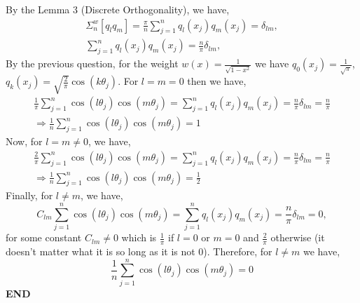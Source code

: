 \documentclass[12pt,a4paper]{article}
\begin{document}
By the Lemma 3 (Discrete Orthogonality), we have,
\begin{align*}
	\ensuremath{\Sigma}_{n}^w[q_lq_m] = \frac{\ensuremath{\pi}}{n}\sum_{j=1}^n q_l(x_j)q_m(x_j) = \ensuremath{\delta}_{lm}, \\
	\sum_{j=1}^n q_l(x_j)q_m(x_j) = \frac{n}{\ensuremath{\pi}}\ensuremath{\delta}_{lm},
\end{align*}
By the previous question, for the weight $w(x) = \frac{1}{\sqrt{1-x^2}}$ we have $q_0(x_j) = \frac{1}{\sqrt{\ensuremath{\pi}}}$, $q_k(x_j) = \sqrt{\frac{2}{\ensuremath{\pi}}}\cos(k \ensuremath{\theta}_j).$ For $l = m = 0$ then we have,
\begin{align*}
	\frac{1}{\ensuremath{\pi}}\sum_{j=1}^n \cos(l \ensuremath{\theta}_j)\cos(m \ensuremath{\theta}_j) =\sum_{j=1}^nq_l(x_j)q_m(x_j) =  \frac{n}{\ensuremath{\pi}}\ensuremath{\delta}_{lm} = \frac{n}{\ensuremath{\pi}} \\
	\Rightarrow \frac{1}{n}\sum_{j=1}^n \cos(l \ensuremath{\theta}_j)\cos(m \ensuremath{\theta}_j) = 1\
\end{align*}
Now, for $l = m \ensuremath{\neq} 0$, we have,
\begin{align*}
	\frac{2}{\ensuremath{\pi}}\sum_{j=1}^n \cos(l \ensuremath{\theta}_j)\cos(m \ensuremath{\theta}_j) =\sum_{j=1}^nq_l(x_j)q_m(x_j) =  \frac{n}{\ensuremath{\pi}}\ensuremath{\delta}_{lm} = \frac{n}{\ensuremath{\pi}} \\
	\Rightarrow \frac{1}{n}\sum_{j=1}^n \cos(l \ensuremath{\theta}_j)\cos(m \ensuremath{\theta}_j) = \frac{1}{2}\
\end{align*}
Finally, for $l \ensuremath{\neq} m$, we have,
\[
C_{lm}\sum_{j=1}^n\cos(l \ensuremath{\theta}_j)\cos(m \ensuremath{\theta}_j) = \sum_{j=1}^nq_l(x_j )q_m(x_j) = \frac{n}{\ensuremath{\pi}}\ensuremath{\delta}_{lm} = 0,
\]
for some constant $C_{lm} \ensuremath{\neq} 0$ which is $\frac{1}{\ensuremath{\pi}}$ if $l = 0$ or $m = 0$ and $\frac{2}{\ensuremath{\pi}}$ otherwise (it doesn't matter what it is so long as it is not 0). Therefore, for $l \ensuremath{\neq} m$ we have,
\[
\frac{1}{n}\sum_{j=1}^n \cos(l \ensuremath{\theta}_j)\cos(m \ensuremath{\theta}_j) = 0
\]
\textbf{END}
\end{document}
